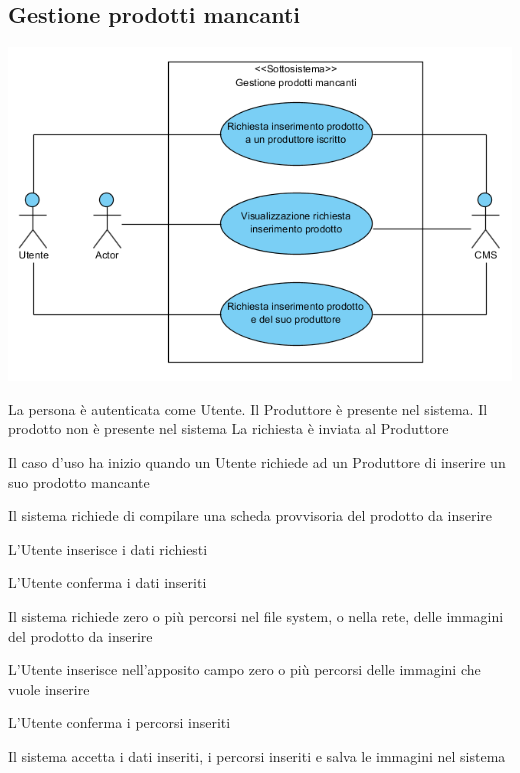 \subsection{Gestione prodotti mancanti}
\begin{center}
   \includegraphics[width=\textwidth]{assets/visualParadigm/GestioneProdottiMancanti}
\end{center}
{}
{La persona è autenticata come Utente. Il Produttore è presente nel sistema. Il prodotto non è presente nel sistema}
{La richiesta è inviata al Produttore}
{\begin{enumCU}
		\item Il caso d'uso ha inizio quando un Utente richiede ad un Produttore di inserire un suo prodotto mancante
		\item Il sistema richiede di compilare una scheda provvisoria del prodotto da inserire
		\item L'Utente inserisce i dati richiesti \label{curicinsimmpro:1}
		\item L'Utente conferma i dati inseriti 
		\item Il sistema richiede zero o più percorsi nel file system, o nella rete, delle immagini del prodotto da inserire
		\item L'Utente inserisce nell'apposito campo zero o più percorsi delle immagini che vuole inserire \label{curicinsimmpro:2}
		\item L'Utente conferma i percorsi inseriti \label{curicinsimmpro:3}
		\item Il sistema accetta i dati inseriti, i percorsi inseriti e salva le immagini nel sistema
	\end{enumCU}}
